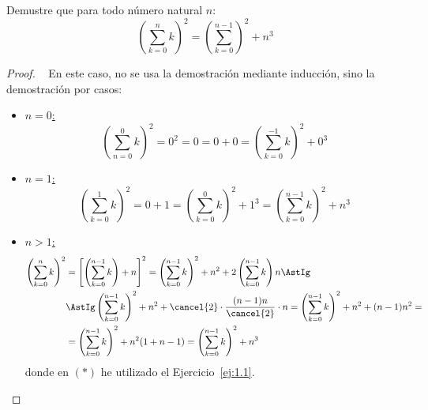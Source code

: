 \begin{ejercicio}\label{ej:1.2}
    Demustre que para todo número natural $n$:
    $$\left(\sum_{k=0}^n k\right)^2 = \left(\sum_{k=0}^{n-1}\right)^2 + n^3$$
\begin{proof}~
    En este caso, no se usa la demostración mediante inducción, sino la demostración por casos:
    \begin{itemize}
        \item \ul{$n = 0$:}
            $$\left(\sum_{n=0}^0 k\right)^2 = 0^2 = 0 = 0+0 = \left(\sum_{k=0}^{-1}k\right)^2 + 0^3$$
        \item \ul{$n = 1$:}
            $$\left(\sum_{k=0}^1 k\right)^2 = 0+1 = \left(\sum_{k=0}^0 k\right)^2 + 1^3 = \left(\sum_{k=0}^{n-1} k\right)^2 + n^3$$
        \item \ul{$n > 1$:}
        \begin{align*}
            \left(\sum_{k=0}^n k\right)^2 &= \left[\left(\sum_{k=0}^{n-1} k\right) + n\right]^2 = \left(\sum_{k=0}^{n-1}k\right)^2 + n^2 + 2\left(\sum_{k=0}^{n-1} k\right)n \AstIg\\
            &\AstIg \left(\sum_{k=0}^{n-1}k\right)^2 + n^2 + \cancel{2} \cdot \dfrac{(n-1)n}{\cancel{2}}\cdot n = \left(\sum_{k=0}^{n-1}k\right)^2 + n^2 + (n-1)n^2 =\\
            &= \left(\sum_{k=0}^{n-1}k\right)^2 + n^2 (1+n-1) = \left(\sum_{k=0}^{n-1}k\right)^2 + n^3
        \end{align*}
        donde en $(\ast)$ he utilizado el Ejercicio~\ref{ej:1.1}.
    \end{itemize}
\end{proof}
\end{ejercicio}

